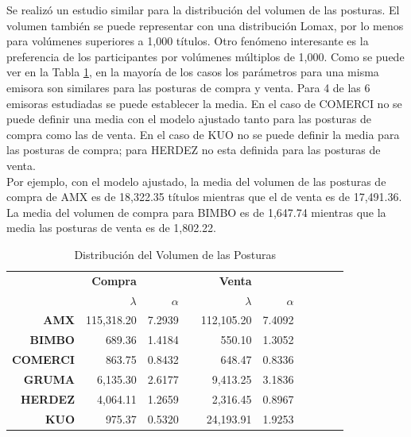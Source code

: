 \documentclass[11pt]{article}
\numberwithin{equation}{section} %
\begin{document}
Se realizó un estudio similar para la distribución del volumen de las posturas. El volumen también se puede representar con una distribución Lomax, por lo menos para volúmenes superiores a 1,000 títulos. Otro fenómeno interesante es la preferencia de los participantes por volúmenes múltiplos de 1,000. Como se puede ver en la Tabla \ref{tab:powervolumen}, en la mayoría de los casos los parámetros para una misma emisora son similares para las posturas de compra y venta. Para 4 de las 6 emisoras estudiadas se puede establecer la media. En el caso de COMERCI no se puede definir una media con el modelo ajustado tanto para las posturas de compra como las de venta. En el caso de KUO no se puede definir la media para las posturas de compra; para HERDEZ no esta definida para las posturas de venta.\\

Por ejemplo, con el modelo ajustado, la media del volumen de las posturas de compra de AMX es de 18,322.35 títulos mientras que el de venta es de 17,491.36. La media del volumen de compra para BIMBO es de 1,647.74 mientras que la media las posturas de venta es de 1,802.22.\\

\begin{table}[htbp]
\centering
\caption{Distribución del Volumen de las Posturas}
\begin{tabular}{r|r|r|r|r|r|r|r|r|r|}
\multicolumn{1}{r}{} & \multicolumn{1}{r}{\textbf{Compra}} & \multicolumn{1}{r}{} & \multicolumn{1}{r}{} & \multicolumn{1}{r}{\textbf{Venta}} & \multicolumn{1}{r}{} \\
\cline{2-3}
\cline{5-6}
& $\lambda$ & $\alpha$ & & $\lambda$ & $\alpha$ \\
\cline{2-3}
\cline{5-6}
\textbf{AMX}   & 115,318.20 & 7.2939 & & 112,105.20 & 7.4092 \\
\textbf{BIMBO} & 689.36 & 1.4184 & & 550.10 & 1.3052 \\
\textbf{COMERCI}   & 863.75 & 0.8432 & & 648.47 & 0.8336 \\
\textbf{GRUMA} & 6,135.30 & 2.6177 & & 9,413.25 & 3.1836 \\
\textbf{HERDEZ}   & 4,064.11 & 1.2659 & & 2,316.45 & 0.8967 \\
\textbf{KUO}   & 975.37 & 0.5320 & & 24,193.91 & 1.9253 \\
\cline{2-3}
\cline{5-6}
\end{tabular}%
\label{tab:powervolumen}%
\end{table}%
\end{document}
